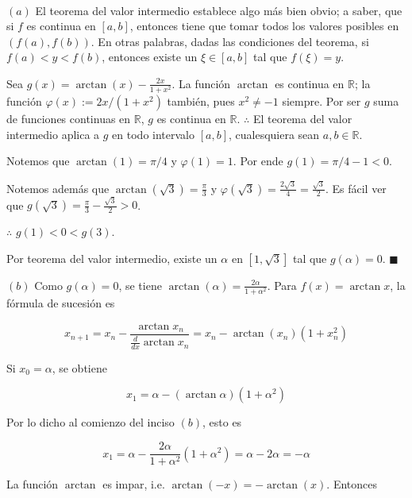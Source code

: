 \documentclass[12pt]{article}
\begin{document}
~

$(a)$ El teorema del valor intermedio establece algo más bien obvio; a saber, que si
$f$ es continua en $[a, b]$, entonces tiene que tomar todos los valores posibles
en $(f(a), f(b))$. En otras palabras, dadas las condiciones del teorema, si
$f(a) < y < f(b)$, entonces existe un $\xi \in [a, b]$ tal que $f\left( \xi
\right) = y$.

Sea $g(x) = \arctan(x) - \frac{2x}{1+x^2}$. La función $\arctan$ es continua en
$\mathbb{R}$; la función $\varphi(x) := 2x / (1+x^2)$ también, pues $x^2 \neq -1$ siempre. Por
ser $g$ suma de funciones continuas en $\mathbb{R}$, $g$ es continua en
$\mathbb{R}$. $\therefore $ El teorema del valor intermedio aplica a $g$ en todo
intervalo $[a, b]$, cualesquiera sean $a, b \in \mathbb{R}$.

Notemos que $\arctan(1) = \pi / 4$ y $\varphi(1) = 1$. Por ende $g(1) = \pi / 4 - 1 < 0$.

Notemos además que $\arctan(\sqrt{3}) = \frac{\pi}{3}$ y $\varphi(\sqrt{3} ) =
\frac{2\sqrt{3} }{4}= \frac{\sqrt{3} }{2}$. Es fácil ver que $g(\sqrt{3}) =
\frac{\pi}{3} - \frac{\sqrt{3} }{2} > 0 $.

$\therefore $ $g(1) < 0 < g(3)$.

Por teorema del valor intermedio, existe un $\alpha$ en $[1, \sqrt{3}] $ tal que
$g(\alpha) = 0$. $\blacksquare$

$(b)$ Como $g(\alpha) = 0$, se tiene $\arctan(\alpha) = \frac{2\alpha}{1 +
\alpha^2}$. Para $f(x) = \arctan x$, la fórmula de sucesión es


\begin{equation*}
    x_{n+1} = x_n - \frac{\arctan x_n}{\frac{d}{dx} \arctan x_n} = x_n - \arctan
    (x_n) \left( 1 + x_n^2 \right) 
\end{equation*}

Si $x_0 = \alpha$, se obtiene

\begin{equation*}
    x_{1} = \alpha - (\arctan \alpha) \left( 1 + \alpha^2 \right) 
\end{equation*}

Por lo dicho al comienzo del inciso $(b)$, esto es 

\begin{equation*}
    x_1 = \alpha - \frac{2\alpha}{1+\alpha^2} \left( 1 + \alpha^2 \right)  =
    \alpha - 2\alpha = - \alpha
\end{equation*}

La función $\arctan$ es impar, i.e. $\arctan(- x) = -\arctan(x)$. Entonces 
\end{document}
